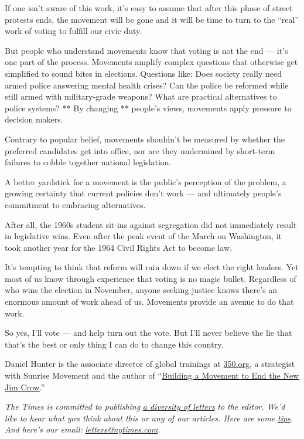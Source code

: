 If one isn't aware of this work, it's easy to assume that after this
phase of street protests ends, the movement will be gone and it will be
time to turn to the ``real'' work of voting to fulfill our civic duty.

But people who understand movements know that voting is not the end ---
it's one part of the process. Movements amplify complex questions that
otherwise get simplified to sound bites in elections. Questions like:
Does society really need armed police answering mental health crises?
Can the police be reformed while still armed with military-grade
weapons? What are practical alternatives to police systems? ** By
changing ** people's views, movements apply pressure to decision makers.

Contrary to popular belief, movements shouldn't be measured by whether
the preferred candidates get into office, nor are they undermined by
short-term failures to cobble together national legislation.

A better yardstick for a movement is the public's perception of the
problem, a growing certainty that current policies don't work --- and
ultimately people's commitment to embracing alternatives.

After all, the 1960s student sit-ins against segregation did not
immediately result in legislative wins. Even after the peak event of the
March on Washington, it took another year for the 1964 Civil Rights Act
to become law.

It's tempting to think that reform will rain down if we elect the right
leaders. Yet most of us know through experience that voting is no magic
bullet. Regardless of who wins the election in November, anyone seeking
justice knows there's an enormous amount of work ahead of us. Movements
provide an avenue to do that work.

So yes, I'll vote --- and help turn out the vote. But I'll never believe
the lie that that's the best or only thing I can do to change this
country.

Daniel Hunter is the associate director of global trainings at
\href{http://trainings.350.org/}{350.org}, a strategist with Sunrise
Movement and the author of
``\href{http://www.newjimcroworganizing.org/}{Building a Movement to End
the New Jim Crow}.''

\emph{The Times is committed to publishing}
\href{https://www.nytimes.com/2019/01/31/opinion/letters/letters-to-editor-new-york-times-women.html}{\emph{a
diversity of letters}} \emph{to the editor. We'd like to hear what you
think about this or any of our articles. Here are some}
\href{https://help.nytimes.com/hc/en-us/articles/115014925288-How-to-submit-a-letter-to-the-editor}{\emph{tips}}\emph{.
And here's our email:}
\href{mailto:letters@nytimes.com}{\emph{letters@nytimes.com}}\emph{.}

